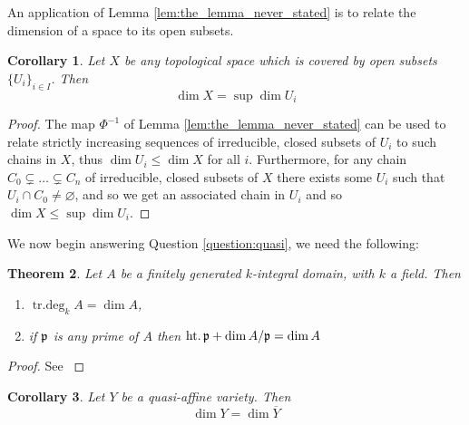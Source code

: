 \documentclass[12pt]{article}
\theoremstyle{plain}
\newtheorem{thm}{Theorem}[subsection] %
\newtheorem{cor}[thm]{Corollary}
\theoremstyle{definition}
\begin{document}
An application of Lemma \ref{lem:the_lemma_never_stated} is to relate the dimension of a space to its open subsets.
\begin{cor}
Let $X$ be any topological space which is covered by open subsets $\lbrace U_i\rbrace_{i \in I}$. Then
\begin{equation}
    \operatorname{dim}X = \operatorname{sup}\operatorname{dim}U_i
\end{equation}
\end{cor}
\begin{proof}
The map $\Phi^{-1}$ of Lemma \ref{lem:the_lemma_never_stated} can be used to relate strictly increasing sequences of irreducible, closed subsets of $U_i$ to such chains in $X$, thus $\operatorname{dim}U_i \leq \operatorname{dim}X$ for all $i$. Furthermore, for any chain $C_0 \subsetneq \hdots \subsetneq C_n$ of irreducible, closed subsets of $X$ there exists some $U_i$ such that $U_i \cap C_0 \neq \varnothing$, and so we get an associated chain in $U_i$ and so $\operatorname{dim}X \leq \operatorname{sup}\operatorname{dim}U_i$.
\end{proof}
We now begin answering Question \ref{question:quasi}, we need the following:
\begin{thm}
\label{thm:onepointeight}
Let $A$ be a finitely generated $k$-integral domain, with $k$ a field. Then
\begin{enumerate}
    \item\label{thm:onepointeighta} $\operatorname{tr.deg}_kA = \operatorname{dim}A$,
    \item\label{thm:onepointeightb} if $\frak{p}$ is any prime of $A$ then $\operatorname{ht.}\frak{p} + \operatorname{dim}A/\frak{p} = \operatorname{dim}A$
\end{enumerate}
\end{thm}
\begin{proof}
See \cite{dimension}
\end{proof}
\begin{cor}\label{lem:quasi_dimension}
Let $Y$ be a quasi-affine variety. Then
\begin{equation}
    \operatorname{dim}Y = \operatorname{dim}\overline{Y}
\end{equation}
\end{cor}
\end{document}
